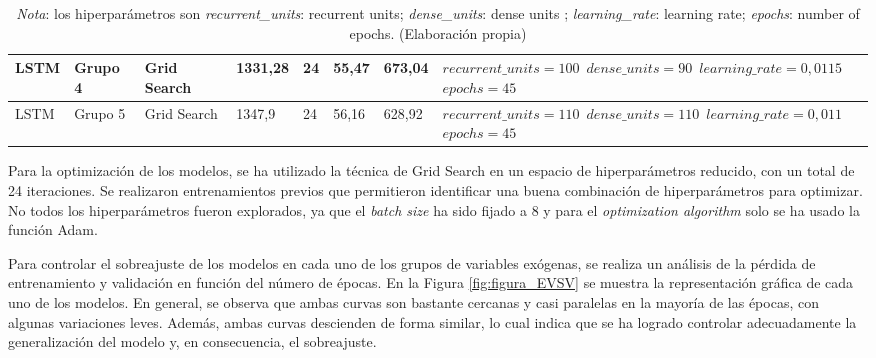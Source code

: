 \documentclass[12pt,a4paper]{report}
\begin{document}
\begin{table}[H]
\begin{tabular}{m{1cm} m{1.2cm} m{1.2cm} m{1cm} m{1cm} m{1.2cm} m{1.2cm} m{3.5cm}}
\hline
LSTM   & Grupo 4 & Grid Search & 1331,28 & 24 & 55,47 & 673,04 & \texttt{$recurrent\_units=100$ \newline $dense\_units=90$ \newline $learning\_rate=0,0115$ \newline $epochs=45$} \\[0.5em]
\hline
LSTM   & Grupo 5 & Grid Search & 1347,9 & 24 & 56,16 & 628,92 & \texttt{$recurrent\_units=110$ \newline $dense\_units=110$ \newline $learning\_rate=0,011$ \newline $epochs=45$} \\
\bottomrule
\end{tabular}
\label{tab:resultados_optimizacion_lstm}
\caption*{\textit{Nota}: los hiperparámetros son \textit{recurrent\_units}: recurrent units; \textit{dense\_units}: dense units ; \textit{learning\_rate}: learning rate; \textit{epochs}: number of epochs. (Elaboración propia)}
\end{table}

Para la optimización de los modelos, se ha utilizado la técnica de Grid Search en un espacio de hiperparámetros reducido, con un total de 24 iteraciones. Se realizaron entrenamientos previos que permitieron identificar una buena combinación de hiperparámetros para optimizar. No todos los hiperparámetros fueron explorados, ya que el \textit{batch size} ha sido fijado a 8 y para el \textit{optimization algorithm} solo se ha usado la función Adam.

Para controlar el sobreajuste de los modelos en cada uno de los grupos de variables exógenas, se realiza un análisis de la pérdida de entrenamiento y validación en función del número de épocas. En la Figura \ref{fig:figura_EVSV} se muestra la representación gráfica de cada uno de los modelos. En general, se observa que ambas curvas son bastante cercanas y casi paralelas en la mayoría de las épocas, con algunas variaciones leves. Además, ambas curvas descienden de forma similar, lo cual indica que se ha logrado controlar adecuadamente la generalización del modelo y, en consecuencia, el sobreajuste.
\end{document}
